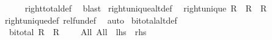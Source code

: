 \begin{isabellebody}
\ \ \ \ \isamarkupfalse%
\ right{\isacharunderscore}{\kern0pt}total{\isacharunderscore}{\kern0pt}def\ \isamarkupfalse%
\ blast\isanewline
{}\isamarkupfalse%
%
\endisatagproof
{\isafoldproof}%
%
\isadelimproof
\isanewline
%
\endisadelimproof
\isanewline
{}\isamarkupfalse%
\ right{\isacharunderscore}{\kern0pt}unique{\isacharunderscore}{\kern0pt}alt{\isacharunderscore}{\kern0pt}def{}{\isacharcolon}{\kern0pt}\isanewline
\ \ {\isachardoublequoteopen}right{\isacharunderscore}{\kern0pt}unique\ R\ {\isasymlongleftrightarrow}\ {\isacharparenleft}{\kern0pt}R\ {\isacharequal}{\kern0pt}{\isacharequal}{\kern0pt}{\isacharequal}{\kern0pt}{\isachargreater}{\kern0pt}\ R\ {\isacharequal}{\kern0pt}{\isacharequal}{\kern0pt}{\isacharequal}{\kern0pt}{\isachargreater}{\kern0pt}\ {\isacharparenleft}{\kern0pt}{\isasymlongrightarrow}{\isacharparenright}{\kern0pt}{\isacharparenright}{\kern0pt}\ {\isacharparenleft}{\kern0pt}{\isacharequal}{\kern0pt}{\isacharparenright}{\kern0pt}\ {\isacharparenleft}{\kern0pt}{\isacharequal}{\kern0pt}{\isacharparenright}{\kern0pt}{\isachardoublequoteclose}\isanewline
%
\isadelimproof
\ \ %
\endisadelimproof
%
\isatagproof
{}\isamarkupfalse%
\ right{\isacharunderscore}{\kern0pt}unique{\isacharunderscore}{\kern0pt}def\ rel{\isacharunderscore}{\kern0pt}fun{\isacharunderscore}{\kern0pt}def\ \isamarkupfalse%
\ auto%
\endisatagproof
{\isafoldproof}%
%
\isadelimproof
\isanewline
%
\endisadelimproof
\isanewline
{}\isamarkupfalse%
\ bi{\isacharunderscore}{\kern0pt}total{\isacharunderscore}{\kern0pt}alt{\isacharunderscore}{\kern0pt}def{}{\isacharcolon}{\kern0pt}\isanewline
\ \ {\isachardoublequoteopen}bi{\isacharunderscore}{\kern0pt}total\ R\ {\isasymlongleftrightarrow}\ {\isacharparenleft}{\kern0pt}{\isacharparenleft}{\kern0pt}R\ {\isacharequal}{\kern0pt}{\isacharequal}{\kern0pt}{\isacharequal}{\kern0pt}{\isachargreater}{\kern0pt}\ {\isacharparenleft}{\kern0pt}{\isacharequal}{\kern0pt}{\isacharparenright}{\kern0pt}{\isacharparenright}{\kern0pt}\ {\isacharequal}{\kern0pt}{\isacharequal}{\kern0pt}{\isacharequal}{\kern0pt}{\isachargreater}{\kern0pt}\ {\isacharparenleft}{\kern0pt}{\isacharequal}{\kern0pt}{\isacharparenright}{\kern0pt}{\isacharparenright}{\kern0pt}\ All\ All{\isachardoublequoteclose}\ {\isacharparenleft}{\kern0pt}\ {\isachardoublequoteopen}{\isacharquery}{\kern0pt}lhs\ {\isacharequal}{\kern0pt}\ {\isacharquery}{\kern0pt}rhs{\isachardoublequoteclose}{\isacharparenright}{\kern0pt}\isanewline
%

\end{isabellebody}
